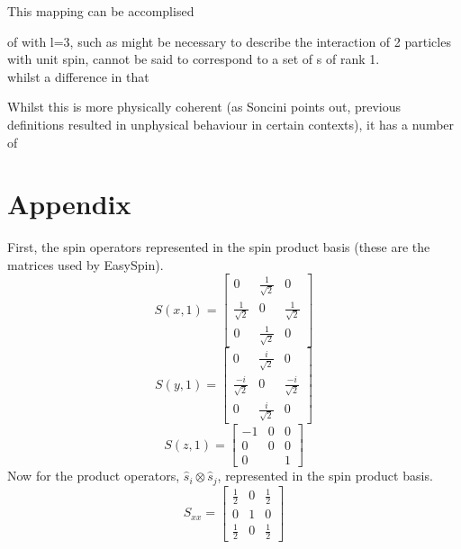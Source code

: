 \documentclass[12pt]{article}
\begin{document}
\noindent This mapping can be accomplised 
 

 of with l=3, such as might be necessary 
to describe the interaction of 2 particles with unit spin, cannot be said to correspond to a set of s of rank 1.\\


whilst a  
difference in that 


 Whilst this
is more physically coherent (as Soncini points out, previous definitions resulted in
unphysical behaviour in certain contexts), it has a number of 


\section{Appendix}
First, the  spin operators represented in the spin product basis (these are the matrices
used by EasySpin).
\begin{equation}
S(x,1) = 
\begin{bmatrix}
0                  & \frac{1}{\sqrt{2}} & 0\\
\frac{1}{\sqrt{2}} & 0                 & \frac{1}{\sqrt{2}} \\ 
0                  & \frac{1}{\sqrt{2}} & 0
\end{bmatrix}
\end{equation}
\begin{equation}
S(y,1) = 
\begin{bmatrix}
0                  & \frac{i}{\sqrt{2}} & 0\\
\frac{-i}{\sqrt{2}} & 0                 & \frac{-i}{\sqrt{2}} \\ 
0                  & \frac{i}{\sqrt{2}} & 0
\end{bmatrix}
\end{equation}
\begin{equation}
S(z,1) = 
\begin{bmatrix}
-1                  & 0 & 0\\
0 & 0               & 0    \\ 
0                   &   & 1
\end{bmatrix}
\end{equation}
Now for the product operators, $\hat{s}_{i}\otimes\hat{s}_{j}$, represented in the
spin product basis.
\begin{equation}
S_{xx} = 
\begin{bmatrix}
\frac{1}{2} & 0  & \frac{1}{2} \\ 
0           & 1 & 0\\
\frac{1}{2} & 0  & \frac{1}{2} 
\end{bmatrix}
\end{equation}
\end{document}
